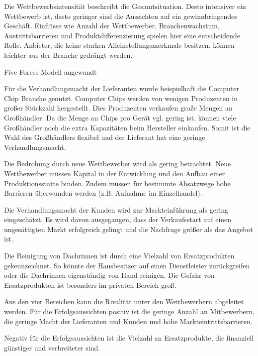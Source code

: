         \noindent
        Die Wettbewerbsintensität beschreibt die Gesamtsituation. Desto intensiver ein Wettbewerb ist, desto geringer
        sind die Aussichten auf ein gewinnbringendes Geschäft. Einflüsse wie Anzahl der Wettbewerber, Branchenwachstum,
        Austrittsbarrieren und Produktdifferenzierung spielen hier eine entscheidende Rolle. Anbieter, die keine starken
        Alleinstellungsmerkmale besitzen, können leichter aus der Branche gedrängt werden.

        \noindent
        Five Forces Modell angewandt

        \noindent
        Für die Verhandlungsmacht der Lieferanten wurde beispielhaft die Computer Chip Branche genutzt. Computer Chips
        werden von wenigen Produzenten in großer Stückzahl hergestellt. Dies Produzenten verkaufen große Mengen an
        Großhändler. Da die Menge an Chips pro Gerät vgl. gering ist, können viele Großhändler noch die extra
        Kapazitäten beim Hersteller einkaufen. Somit ist die Wahl des Großhändlers flexibel und der Lieferant hat eine
        geringe Verhandlungsmacht.

        \noindent
        Die Bedrohung durch neue Wettbewerber wird als gering betrachtet. Neue Wettbewerber müssen Kapital in der
        Entwicklung und den Aufbau einer Produktionsstätte binden. Zudem müssen für bestimmte Absatzwege hohe Barrieren
        überwunden werden (z.B. Aufnahme im Einzelhandel).

        \noindent
        Die Verhandlungsmacht der Kunden wird zur Markteinführung als gering eingeschätzt. Es wird davon ausgegangen,
        dass der Verkaufsstart auf einen ungesättigten Markt erfolgreich gelingt und die Nachfrage größer als das
        Angebot ist.

        \noindent
        Die Reinigung von Dachrinnen ist durch eine Vielzahl von Ersatzprodukten gekennzeichnet. So könnte der
        Hausbesitzer auf einen Dienstleister zurückgreifen oder die Dachrinnen eigenständig von Hand reinigen. Die
        Gefahr von Ersatzprodukten ist besonders im privaten Bereich groß.

        \noindent
        Aus den vier Bereichen kann die Rivalität unter den Wettbewerbern abgeleitet werden. Für die Erfolgsaussichten
        positiv ist die geringe Anzahl an Mitbewerbern, die geringe Macht der Lieferanten und Kunden und hohe
        Markteintrittsbarrieren.

        \noindent
        Negativ für die Erfolgsaussichten ist die Vielzahl an Ersatzprodukte, die finanziell günstiger und verbreiteter
        sind.

